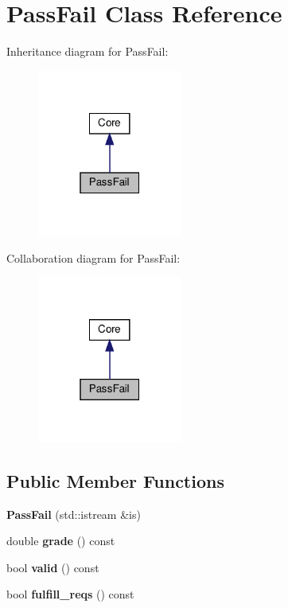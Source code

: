 \hypertarget{classPassFail}{}\section{Pass\+Fail Class Reference}
\label{classPassFail}


Inheritance diagram for Pass\+Fail\+:
\nopagebreak
\begin{figure}[H]
\begin{center}
\leavevmode
\includegraphics[width=135pt]{classPassFail__inherit__graph}
\end{center}
\end{figure}


Collaboration diagram for Pass\+Fail\+:
\nopagebreak
\begin{figure}[H]
\begin{center}
\leavevmode
\includegraphics[width=135pt]{classPassFail__coll__graph}
\end{center}
\end{figure}
\subsection*{Public Member Functions}
\begin{DoxyCompactItemize}
\item 
\mbox{\label{classPassFail_a5c90795505aa60da716935c450919b77}} 
{\bfseries Pass\+Fail} (std\+::istream \&is)
\item 
\mbox{\label{classPassFail_a7f96a2d51a1a72c131ee93aa53bd5848}} 
double {\bfseries grade} () const
\item 
\mbox{\label{classPassFail_a06c77d7cd3c48f95476c17c53a6d7e7c}} 
bool {\bfseries valid} () const
\item 
\mbox{\label{classPassFail_a46d15c8f5f28b4c7b8f1311745c9a2a5}} 
bool {\bfseries fulfill\+\_\+reqs} () const
\end{DoxyCompactItemize}
